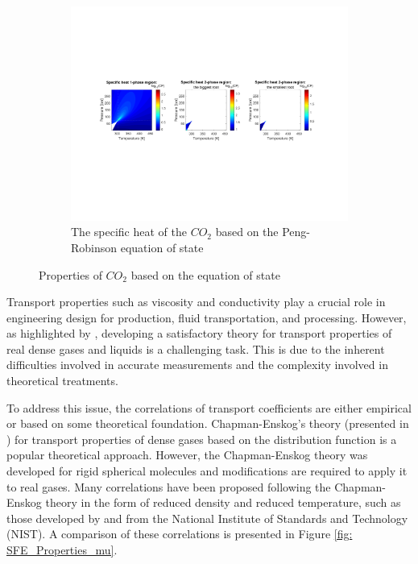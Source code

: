 \documentclass[../Article_Model_Parameters.tex]{subfiles}
\begin{document}
\begin{figure}[H]
\begin{subfigure}[b]{0.95\textwidth}
			\label{fig: SFE_Properties_Density}
		\end{subfigure}
		\hfill
		\begin{subfigure}[b]{0.95\textwidth}
			\centering
			\includegraphics[trim = 2.9cm 7cm 3.cm 7cm,clip,width=\textwidth]{Figures/CP.pdf}	
			\caption{The specific heat of the $CO_2$ based on the Peng-Robinson equation of state}
			\label{fig: SFE_Properties_CP}
		\end{subfigure}
		\caption{Properties of $CO_2$ based on the equation of state}
		\label{fig: SFE_Properties}
	\end{figure}    
	
	Transport properties such as viscosity and conductivity play a crucial role in engineering design for production, fluid transportation, and processing. However, as highlighted by \citet{Sheng1989}, developing a satisfactory theory for transport properties of real dense gases and liquids is a challenging task. This is due to the inherent difficulties involved in accurate measurements and the complexity involved in theoretical treatments.
	
	To address this issue, the correlations of transport coefficients are either empirical or based on some theoretical foundation. Chapman-Enskog's theory (presented in \citet{Chapman1991}) for transport properties of dense gases based on the distribution function is a popular theoretical approach. However, the Chapman-Enskog theory was developed for rigid spherical molecules and modifications are required to apply it to real gases. Many correlations have been proposed following the Chapman-Enskog theory in the form of reduced density and reduced temperature, such as those developed by \citet{Fenghour1998} and \citet{Laesecke2017} from the National Institute of Standards and Technology (NIST). A comparison of these correlations is presented in Figure \ref{fig: SFE_Properties_mu}.
	
\end{document}
